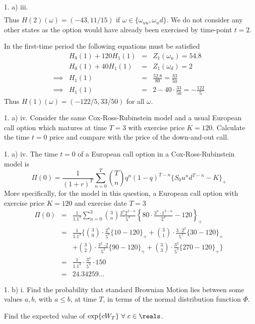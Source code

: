 \documentclass[11pt,a4paper]{article}
\begin{document}
\begin{answer}{1. a) iii.}
\[\begin{array}{rrcl}
  \end{array}\]
  Thus $H(2)(\omega)=(-43,11/15)$ if $\omega\in\{\omega_{uu},\omega_ud\}$. We do not consider any other states as the option would have already been exercised by time-point $t=2$.
  \par In the first-time period the following equations must be satisfied
  \[\begin{array}{rrcl}
    &H_0(1)+120H_1(1)&=&Z_1(\omega_{u})=54.8\\
    &H_0(1)+40H_1(1)&=&Z_1(\omega_{d})=2\\
    \implies&H_1(1)&=&\frac{52.8}{80}=\frac{33}{50}\\
    \implies&H_1(1)&=&2-40\cdot\frac{33}{50}=-\frac{122}5
  \end{array}\]
  Thus $H(1)(\omega)=(-122/5,33/50)$ for all $\omega$.
\end{answer}

\begin{question}{1. a) iv.}
  Consider the same Cox-Ross-Rubinstein model and a usual European call option which matures at time $T=3$ with exercise price $K=120$. Calculate the time $t=0$ price and compare with the price of the down-and-out call.
\end{question}

\begin{answer}{1. a) iv.}
  The time $t=0$ of a European call option in a Cox-Ross-Rubinstein model is
  \[ \Pi(0)=\frac1{(1+r)^T}\sum_{n=0}^T{T\choose n}q^n(1-q)^{T-n}\{S_0u^nd^{T-n}-K\}_+ \]
  More specifically, for the model in this question, a European call option with exercise price $K=120$ and exercise date $T=3$
  \[\begin{array}{rcl}
    \Pi(0)&=&\frac1{1.1^3}\sum_{n=0}^3{3\choose n}\frac{3^n2^{3-n}}{5^3}\left\{80\cdot\frac{3^n\cdot1^{3-n}}{2^3}-120\right\}_+\\
    &=&\frac1{1.1^3}\bigg\{{3\choose 0}\cdot\frac{2^3}{5^3}\{10-120\}_++{3\choose 1}\cdot\frac{3\cdot2^2}{5^3}\{30-120\}_+\\
    &&+{3\choose 2}\cdot\frac{3^2\cdot2}{5^3}\{90-120\}_++{3\choose 3}\cdot\frac{3^3}{5^3}\{270-120\}_+\bigg\}\\
    &=&\frac1{1.1^3}\cdot\frac{3^3}{5^3}\cdot150\\
    &=&24.34259\dots
  \end{array}\]
\end{answer}

\begin{question}{1. b) i.}
  Find the probability that standard Brownian Motion lies between some values $a,b$, with $a\leq b$, at time $T$, in terms of the normal distribution function $\Phi$.
  \par Find the expected value of $\exp\{cW_T\}\ \forall\ c\in\reals$.
\end{question}
\end{document}
